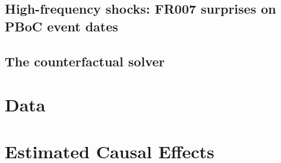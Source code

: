 \documentclass[12pt, a4paper]{article}
\begin{document}

\subsection{High-frequency shocks: FR007 surprises on PBoC event dates}


\subsection{The counterfactual solver}


\section{Data}\label{sec:data}


\section{Estimated Causal Effects}\label{sec:irf}

\end{document}
